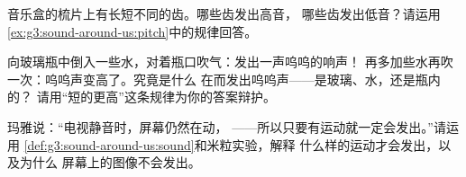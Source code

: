\begin{exercise}[$\star$]\label{exo:g3:sound-around-us:9}
音乐盒的梳片上有长短不同的齿。哪些齿发出高音，
哪些齿发出低音？请运用
\cref{ex:g3:sound-around-us:pitch}中的规律回答。
\end{exercise}

\begin{exercise}[$\star\star$]\label{exo:g3:sound-around-us:10}
向玻璃瓶中倒入一些水，对着瓶口吹气：发出一声呜呜的响声！
再多加些水再吹一次：呜呜声变高了。究竟是什么
在而发出呜呜声——是玻璃、水，还是瓶内的？
请用“短的更高”这条规律为你的答案辩护。
\end{exercise}

\begin{exercise}[$\star\star$]\label{exo:g3:sound-around-us:11}
玛雅说：“电视静音时，屏幕仍然在动，
——所以只要有运动就一定会发出。”请运用
\cref{def:g3:sound-around-us:sound}和米粒实验，解释
什么样的运动才会发出，以及为什么
屏幕上的图像不会发出。
\end{exercise}
